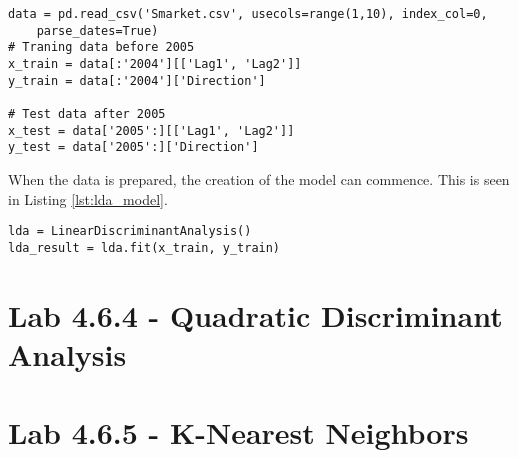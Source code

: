 \begin{lstlisting}[caption={Preparation of data for LDA fitting}, label=lst:lda_data, mathescape=true]
data = pd.read_csv('Smarket.csv', usecols=range(1,10), index_col=0, 
	parse_dates=True)
# Traning data before 2005
x_train = data[:'2004'][['Lag1', 'Lag2']]
y_train = data[:'2004']['Direction']

# Test data after 2005
x_test = data['2005':][['Lag1', 'Lag2']]
y_test = data['2005':]['Direction']
\end{lstlisting}

When the data is prepared, the creation of the model can commence. This is seen in Listing \ref{lst:lda_model}.

\begin{lstlisting}[caption={Creation of LDA model}, label=lst:lda_model, mathescape=true]
lda = LinearDiscriminantAnalysis()
lda_result = lda.fit(x_train, y_train)
\end{lstlisting}


\section{Lab 4.6.4 - Quadratic Discriminant Analysis}
\section{Lab 4.6.5 - K-Nearest Neighbors}

